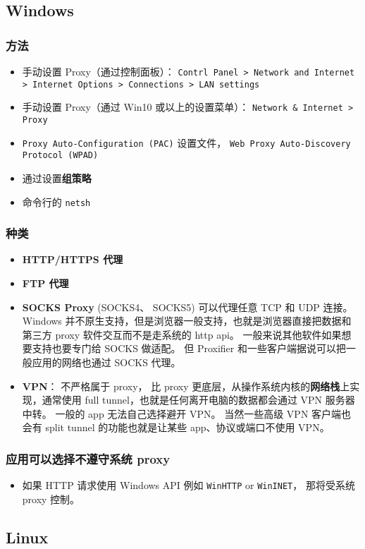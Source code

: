 
\subsection{Windows}

\subsubsection{方法}
\begin{itemize}
\item 手动设置 Proxy（通过控制面板）： \verb`Contrl Panel > Network and Internet > Internet Options > Connections > LAN settings`
\item 手动设置 Proxy（通过 Win10 或以上的设置菜单）： \verb`Network & Internet > Proxy`
\item \verb`Proxy Auto-Configuration (PAC)` 设置文件， \verb`Web Proxy Auto-Discovery Protocol (WPAD)`
\item 通过设置\textbf{组策略}
\item 命令行的 \verb`netsh`
\end{itemize}

\subsubsection{种类}
\begin{itemize}
\item \textbf{HTTP/HTTPS 代理}
\item \textbf{FTP 代理}
\item \textbf{SOCKS Proxy} (SOCKS4、 SOCKS5) 可以代理任意 TCP 和 UDP 连接。Windows 并不原生支持，但是浏览器一般支持，也就是浏览器直接把数据和第三方 proxy 软件交互而不是走系统的 http api。 一般来说其他软件如果想要支持也要专门给 SOCKS 做适配。 但 Proxifier 和一些客户端据说可以把一般应用的网络也通过 SOCKS 代理。
\item \textbf{VPN}： 不严格属于 proxy， 比 proxy 更底层，从操作系统内核的\textbf{网络栈}上实现，通常使用 full tunnel，也就是任何离开电脑的数据都会通过 VPN 服务器中转。 一般的 app 无法自己选择避开 VPN。 当然一些高级 VPN 客户端也会有 split tunnel 的功能也就是让某些 app、协议或端口不使用 VPN。
\end{itemize}

\subsubsection{应用可以选择不遵守系统 proxy}
\begin{itemize}
\item 如果 HTTP 请求使用 Windows API 例如 \verb`WinHTTP` or \verb`WinINET`， 那将受系统 proxy 控制。
\end{itemize}

\subsection{Linux}

